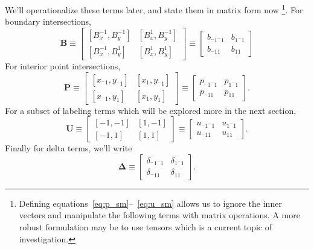 We'll operationalize these terms later, and state them in matrix form now \footnote{
    Defining equations~\ref{eq:p_sm}--~\ref{eq:u_sm} allows us
    to ignore the inner vectors and manipulate the following terms
    with matrix operations.  A more robust formulation may be to
    use tensors which is a current topic of investigation.
  }.  For boundary intersections,
\begin{equation}
  \mathbf{B} \equiv \begin{bmatrix}
    [B_x^{-1}, B_y^{-1}] & [B_x^{1}, B_y^{-1}] \\
    [B_x^{-1}, B_y^{1}] & [B_x^{1}, B_y^{1}]
    \end{bmatrix} \equiv \begin{bmatrix}
      b_{^-1^-1} & b_{1^-1} \\
      b_{^-11} & b_{11}
      \end{bmatrix}
      \label{eq:B}
\end{equation}
For interior point intersections,
\begin{equation}
  \mathbf{P} \equiv \begin{bmatrix}
    [x_{^-1}, y_{^-1}] & [x_1, y_{^-1}] \\
    [x_{^-1}, y_1] & [x_1, y_1]
  \end{bmatrix} \equiv \begin{bmatrix}
    p_{^-1^-1} & p_{1^-1} \\
    p_{^-11} & p_{11}
    \end{bmatrix}.
  \label{eq:P}
\end{equation}
For a subset of labeling terms which will be explored
more in the next section,
\begin{equation}
\mathbf{U} \equiv \begin{bmatrix}
  [-1, -1] & [1, -1] \\
  [-1, 1] & [1, 1]
  \end{bmatrix} \equiv \begin{bmatrix}
    u_{^-1^-1} & u_{1^-1} \\
    u_{^-11} & u_{11}
    \end{bmatrix}.
  \label{eq:indices}
\end{equation}
Finally for delta terms, we'll write
\begin{equation}
  \mathbf{\Delta} \equiv \begin{bmatrix}
    \delta_{^-1^-1} & \delta_{1^-1} \\
    \delta_{^-11} & \delta_{11}
    \end{bmatrix}.
    \label{eq:D}
\end{equation}
